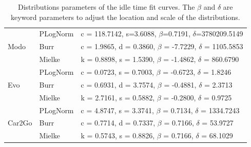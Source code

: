 \begin{table}
\centering
\setlength{\tabcolsep}{2.3pt}
	\begin{tabular}{lll}
	\hline
	\multirow{3}{*}{Modo}   & PLogNorm       & c = 118.7142, s=3.6088,  $\beta$=0.7191,  $\delta$=3780209.5149                     \\
	                        & Burr                & c = 1.9865, d = 0.3860,  $\beta$ = -7.7229, $\delta$ = 1105.5853 \\
	                        & Mielke & k = 0.8898, s = 1.5390,  $\beta$ = -1.4862, $\delta$ = 860.6790 \\ \hline
	\multirow{3}{*}{Evo}    & PLogNorm       & c = 0.0723, s = 0.7003,  $\beta$ = -0.6723,  $\delta$ = 1.8246                          \\
	                        & Burr                & c = 0.6931, d = 3.7574, $\beta$ = -0.4881, $\delta$ = 2.3713   \\
	                        & Mielke & k = 2.7161, s = 0.5882, $\beta$ = -0.2800, $\delta$ = 0.9725 \\ \hline
	\multirow{3}{*}{Car2Go} & PLogNorm       & c = 4.8747, s = 3.3741,  $\beta$ = 0.7134,  $\delta$ = 1334.7243                           \\
	                        & Burr                & c = 0.7714, d = 0.7337, $\beta$ = 0.7166, $\delta$ = 53.9727   \\
	                        & Mielke & k = 0.5743, s = 0.8826, $\beta$ = 0.7166, $\delta$ = 68.1029   \\ \hline
	\end{tabular}
\caption{Distributions parameters of the idle time fit curves. The $\beta$ and $\delta$ are keyword parameters to adjust the location and scale of the distributions.}	\label{table:fit_idle}

\end{table}

